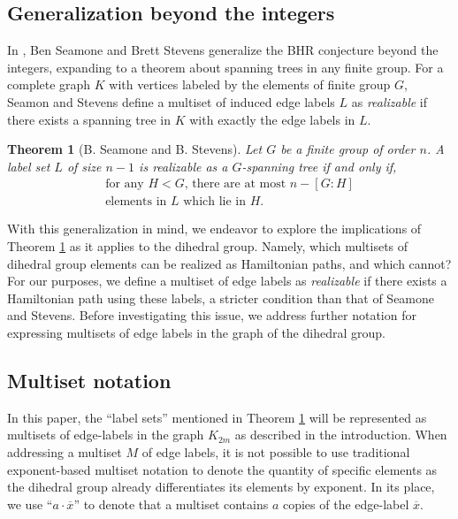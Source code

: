 \documentclass[12pt]{article}
\newtheorem{thm}{Theorem}[section]
\newcommand{\ol}[1]{\overline{#1}} %
\begin{document}
\subsection{Generalization beyond the integers}
In \cite{SandS}, Ben Seamone and Brett Stevens generalize the BHR
conjecture beyond the integers, expanding to
a theorem about spanning trees in any finite group. For a complete graph $K$ with
vertices labeled by the elements of finite group $G$, Seamon and Stevens define a
multiset of induced edge labels $L$ as \textit{realizable} if there exists a spanning
tree in $K$ with exactly the edge labels in $L$.

\begin{thm}[B. Seamone and B. Stevens]\label{sst}
  Let $G$ be a finite group of order $n$. A label set $L$ of size $n - 1$
  is realizable as a $G$-spanning tree if and only if,
  \begin{equation}\label{sstcondition}
    \left. \begin{array}{c}
      \textrm{for any $H < G$, there are at most $n - [G:H]$} \\
      \textrm{elements in $L$ which lie in $H$.}
    \end{array}\right.
  \end{equation}
\end{thm}

With this generalization in mind, we endeavor to explore the implications of Theorem \ref{sst}
as it applies to the dihedral group. Namely, which multisets of dihedral group elements can be
realized as Hamiltonian paths, and which cannot? For our purposes, we define a multiset of edge labels
as \textit{realizable} if there exists a Hamiltonian path using these labels, a stricter condition
than that of Seamone and Stevens.
Before investigating this issue, we address further notation
for expressing multisets of edge labels in the graph of the dihedral group.

\subsection{Multiset notation}
In this paper, the ``label sets'' mentioned in Theorem \ref{sst} will be represented
as multisets of edge-labels in the graph $K_{2m}$ as described in the introduction.
When addressing a multiset $M$ of edge labels, it is not
possible to use traditional exponent-based multiset notation to denote the quantity of
specific elements as the dihedral group already differentiates its elements by exponent.
In its place, we use ``$a \cdot \ol{x}$'' to denote that a multiset
contains $a$ copies of the edge-label $\ol{x}$.
\end{document}
